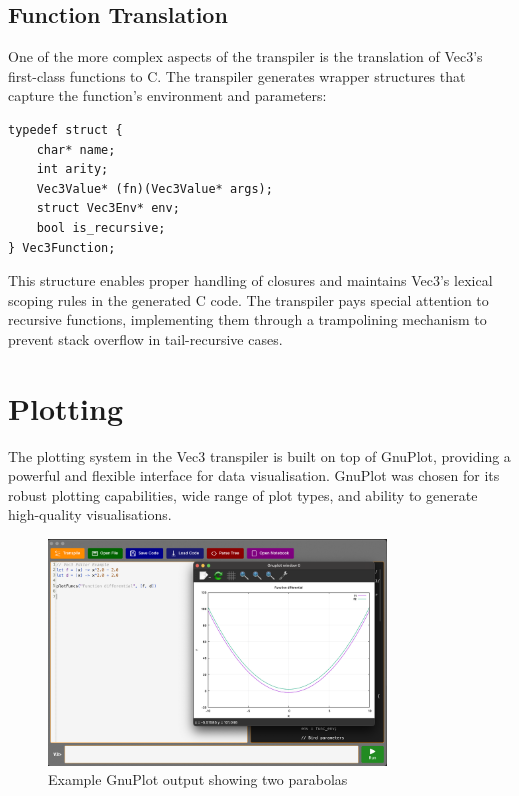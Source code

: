 \subsection{Function Translation}\label{subsec:function-translation}

One of the more complex aspects of the transpiler is the translation of Vec3's first-class functions to C\@.
The transpiler generates wrapper structures that capture the function's environment and parameters:

\begin{verbatim}
typedef struct {
    char* name;
    int arity;
    Vec3Value* (fn)(Vec3Value* args);
    struct Vec3Env* env;
    bool is_recursive;
} Vec3Function;
\end{verbatim}

This structure enables proper handling of closures and maintains Vec3's lexical scoping rules in the generated C code. 
The transpiler pays special attention to recursive functions, implementing them through a trampolining mechanism to prevent stack overflow in tail-recursive cases.

\section{Plotting}\label{sec:plotting-transpiler}
The plotting system in the Vec3 transpiler is built on top of GnuPlot\citet{gnuPlot}, providing a powerful and flexible 
interface for data visualisation.
GnuPlot was chosen for its robust plotting capabilities, wide range of plot types, and ability to generate 
high-quality visualisations.

\begin{figure}[H]
    \centering
    \includegraphics[width=0.8\textwidth]{assets/gnuplot}
    \caption{Example GnuPlot output showing two parabolas}\label{fig:gnuplot-example}
\end{figure}

